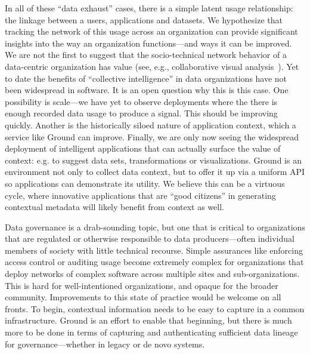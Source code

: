 \documentclass{sig-alternate}
\begin{document}
In all of these ``data exhaust'' cases, there is a simple latent usage relationship: the linkage between a users, applications and datasets. We hypothesize that tracking the network of this usage across an organization can provide significant insights into the way an organization functions---and ways it can be improved. We are not the first to suggest that the socio-technical network behavior of a data-centric organization has value (see, e.g., collaborative visual analysis~\cite{manyeyes,willett}). Yet to date the benefits of ``collective intelligence'' in data organizations have not been widespread in software. It is an open question why this is this case. One possibility is scale---we have yet to observe deployments where the there is enough recorded data usage to produce a signal. This should be improving quickly. Another is the historically siloed nature of application context, which a service like Ground can improve. Finally, we are only now seeing the widespread deployment of intelligent applications that can actually surface the value of context: e.g. to suggest data sets, transformations or visualizations.
Ground is an environment not only to collect data context, but to offer it up via a uniform API so applications can demonstrate its utility. We believe this can be a virtuous cycle, where innovative applications that are ``good citizens'' in generating contextual metadata will likely benefit from context as well.

Data governance is a drab-sounding topic, but one that is critical to organizations that are regulated or otherwise responsible to data producers---often individual members of society with little technical recourse. Simple assurances like enforcing access control or auditing usage become extremely complex for organizations that deploy networks of complex software across multiple sites and sub-organizations. This is hard for well-intentioned organizations, and opaque for the broader community. Improvements to this state of practice would be welcome on all fronts. To begin, contextual information needs to be easy to capture in a common infrastructure. Ground is an effort to enable that beginning, but there is much more to be done in terms of capturing and authenticating sufficient data lineage for governance---whether in legacy or de novo systems.
\end{document}
